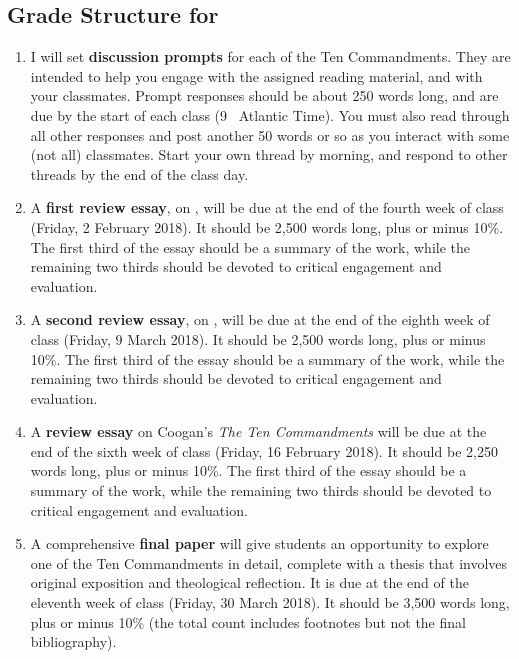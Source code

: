 \documentclass[titlepage]{article}
\begin{document}
\subsection{Grade Structure for \ccode}
\label{structure}

\begin{enumerate}

	\item I will set \textbf{discussion prompts} for each of the Ten
	Commandments. They are intended to help you engage with the assigned
	reading material, and with your classmates. Prompt responses should
	be about 250 words long, and are due by the start of each class (9
	\AM\ Atlantic Time). You must also read through all other responses
	and post another 50 words or so as you interact with some (not all)
	classmates. Start your own thread by morning, and respond to other
	threads by the end of the class day.

	\item A \textbf{first review essay}, on \cite{Seitz}, will be due at
	the end of the fourth week of class (Friday, 2 February 2018). It
	should be 2,500 words long, plus or minus 10\%. The first third of
	the essay should be a summary of the work, while the remaining two
	thirds should be devoted to critical engagement and evaluation.

	\item A \textbf{second review essay}, on \cite{Two}, will be due at
	the end of the eighth week of class (Friday, 9 March 2018). It
	should be 2,500 words long, plus or minus 10\%. The first third of
	the essay should be a summary of the work, while the remaining two
	thirds should be devoted to critical engagement and evaluation.


	\item A \textbf{review essay} on Coogan's \emph{The Ten
	Commandments} will be due at the end of the sixth week of class
	(Friday, 16 February 2018). It should be 2,250 words long, plus or
	minus 10\%. The first third of the essay should be a summary of the
	work, while the remaining two thirds should be devoted to critical
	engagement and evaluation.

	\item A comprehensive \textbf{final paper} will give students an
	opportunity to explore one of the Ten Commandments in detail,
	complete with a thesis that involves original exposition and
	theological reflection. It is due at the end of the eleventh week of
	class (Friday, 30 March 2018). It should be 3,500 words long, plus
	or minus 10\% (the total count includes footnotes but not the final
	bibliography).

\end{enumerate}
\end{document}

